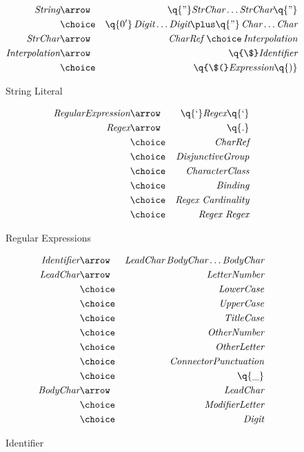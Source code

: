 \begin{figure}[htbp]
\begin{eqnarray*}
\emph{String}&\arrow&\q{"}\emph{StrChar}\ldots\emph{StrChar}\q{"}\\
&\choice&\q{0'}\,\emph{Digit}\ldots\emph{Digit}\plus\q{"}\,\emph{Char}\ldots\emph{Char}\\
\emph{StrChar}&\arrow&\emph{CharRef}\ \choice\,\emph{Interpolation}\\
\emph{Interpolation}&\arrow&\q{\$} \emph{Identifier}\\
&\choice&\q{\$(}\emph{Expression}\q{)}
\end{eqnarray*}
\caption{String Literal}
\label{stringFig}
\end{figure}

\begin{figure}[htbp]
\begin{eqnarray*}
\emph{RegularExpression}&\arrow&\q{`}\emph{Regex}\q{`}\\
\emph{Regex}&\arrow&\q{.}\\
&\choice&\emph{CharRef}\\
&\choice&\emph{DisjunctiveGroup}\\
&\choice&\emph{CharacterClass}\\
&\choice&\emph{Binding}\\
&\choice&\emph{Regex}\ \emph{Cardinality}\\
&\choice&\emph{Regex}\ \emph{Regex}
\end{eqnarray*}
\caption{Regular Expressions}
   \label{regFig}
\end{figure}


\begin{figure}[htbp]
\begin{eqnarray*}
\emph{Identifier}&\arrow&\emph{LeadChar}\,\emph{BodyChar}\ldots\emph{BodyChar}\\
\emph{LeadChar}&\arrow&\emph{LetterNumber}\\
&\choice&\emph{LowerCase}\\
&\choice&\emph{UpperCase}\\
&\choice&\emph{TitleCase}\\
&\choice&\emph{OtherNumber}\\
&\choice&\emph{OtherLetter}\\
&\choice&\emph{ConnectorPunctuation}\\
&\choice&\q{\_}\\
\emph{BodyChar}&\arrow&\emph{LeadChar}\\
&\choice&\emph{ModifierLetter}\\
&\choice&\emph{Digit}
\end{eqnarray*}
\caption{Identifier}
\label{identifierFig}
\end{figure}

